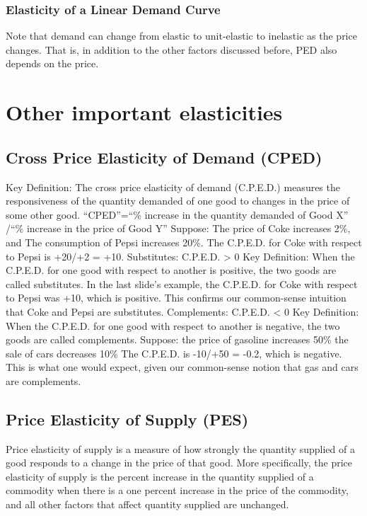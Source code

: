 \documentclass[
  letterpaper,
]{book}
\begin{document}
\subsubsection{Elasticity of a Linear Demand
Curve}\label{elasticity-of-a-linear-demand-curve}

Note that demand can change from elastic to unit-elastic to inelastic as
the price changes. That is, in addition to the other factors discussed
before, PED also depends on the price.

\section{Other important
elasticities}\label{other-important-elasticities}

\subsection{Cross Price Elasticity of Demand
(CPED)}\label{cross-price-elasticity-of-demand-cped}

Key Definition: The cross price elasticity of demand (C.P.E.D.) measures
the responsiveness of the quantity demanded of one good to changes in
the price of some other good. ``CPED''=``\% increase in the quantity
demanded of Good X'' /``\% increase in the price of Good Y'' Suppose:
The price of Coke increases 2\%, and The consumption of Pepsi increases
20\%. The C.P.E.D. for Coke with respect to Pepsi is +20/+2 = +10.
Substitutes: C.P.E.D. \textgreater{} 0 Key Definition: When the C.P.E.D.
for one good with respect to another is positive, the two goods are
called substitutes. In the last slide's example, the C.P.E.D. for Coke
with respect to Pepsi was +10, which is positive. This confirms our
common-sense intuition that Coke and Pepsi are substitutes. Complements:
C.P.E.D. \textless{} 0 Key Definition: When the C.P.E.D. for one good
with respect to another is negative, the two goods are called
complements. Suppose: the price of gasoline increases 50\% the sale of
cars decreases 10\% The C.P.E.D. is -10/+50 = -0.2, which is negative.
This is what one would expect, given our common-sense notion that gas
and cars are complements.

\subsection{Price Elasticity of Supply
(PES)}\label{price-elasticity-of-supply-pes}

Price elasticity of supply is a measure of how strongly the quantity
supplied of a good responds to a change in the price of that good. More
specifically, the price elasticity of supply is the percent increase in
the quantity supplied of a commodity when there is a one percent
increase in the price of the commodity, and all other factors that
affect quantity supplied are unchanged.
\end{document}
